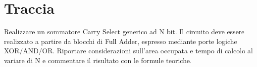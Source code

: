 %

\section{Traccia}

Realizzare un sommatore Carry Select generico ad N bit. Il circuito
deve essere realizzato a partire da blocchi di Full Adder, espresso
mediante porte logiche XOR/AND/OR. Riportare considerazioni sull'area
occupata e tempo di calcolo al variare di N e commentare il risultato
con le formule teoriche.%


